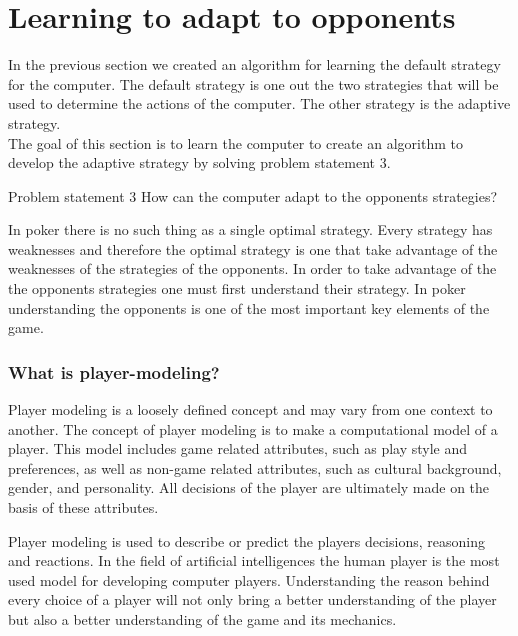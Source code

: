 \section{Learning to adapt to opponents}
\label{sec:part3}

In the previous section we created an algorithm for learning the default strategy for the computer. The default strategy is one out the two strategies that will be used to determine the actions of the computer. The other strategy is the adaptive strategy. \\

The goal of this section is to learn the computer to create an algorithm to develop the adaptive strategy by solving problem statement 3.

\vspace{4mm}
\begin{statementBox2}{Problem statement 3}
  How can the computer adapt to the opponents strategies?
\end{statementBox2}
\vspace{4mm}

In poker there is no such thing as a single optimal strategy. Every strategy has weaknesses and therefore the optimal strategy is one that take advantage of the weaknesses of the strategies of the opponents. In order to take advantage of the the opponents strategies one must first understand their strategy. In poker understanding the opponents is one of the most important key elements of the game.

\subsubsection{What is player-modeling?}
Player modeling is a loosely defined concept and may vary from one context to another. The concept of player modeling is to make a computational model of a player. This model includes game related attributes, such as play style and preferences, as well as non-game related attributes, such as cultural background, gender, and personality. All decisions of the player are ultimately made on the basis of these attributes. 

Player modeling is used to describe or predict the players decisions, reasoning and reactions. In the field of artificial intelligences the human player is the most used model for developing computer players. Understanding the reason behind every choice of a player will not only bring a better understanding of the player but also a better understanding of the game and its mechanics.


